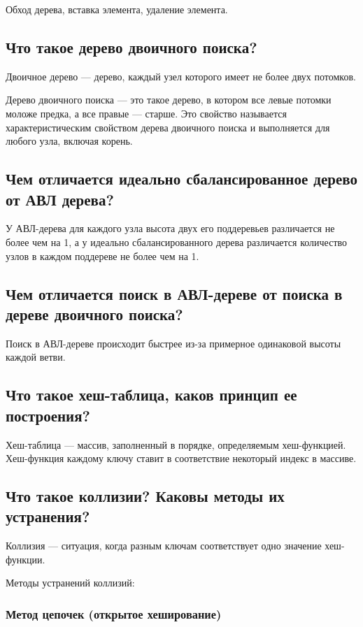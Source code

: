 \documentclass[a4paper,12pt]{extarticle}
\begin{document}
Обход дерева, вставка элемента, удаление элемента.

\subsection{Что такое дерево двоичного поиска?}

Двоичное дерево --- дерево, каждый узел которого имеет не более двух потомков.

Дерево двоичного поиска --- это такое дерево, в котором все левые потомки моложе предка, а все правые --- старше. Это свойство называется характеристическим свойством дерева двоичного поиска и выполняется для любого узла, включая корень.

\subsection{Чем отличается идеально сбалансированное дерево от АВЛ дерева?}

У АВЛ-дерева для каждого узла высота двух его поддеревьев различается не более чем на 1, а у идеально сбалансированного дерева различается количество узлов в каждом поддереве не более чем на 1.


\subsection{Чем отличается поиск в АВЛ-дереве от поиска в дереве двоичного поиска?}

Поиск в АВЛ-дереве происходит быстрее из-за примерное одинаковой высоты каждой ветви.


\subsection{Что такое хеш-таблица, каков принцип ее построения?}

Хеш-таблица --- массив, заполненный в порядке, определяемым хеш-функцией. Хеш-функция каждому ключу ставит в соответствие некоторый индекс в массиве.

\subsection{Что такое коллизии? Каковы методы их устранения?}

Коллизия --- ситуация, когда разным ключам соответствует одно значение хеш-функции.

Методы устранений коллизий:

\subsubsection{Метод цепочек (открытое хеширование)}
\end{document}
